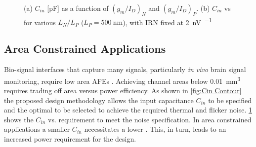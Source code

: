 \begin{figure}[!h]
\begin{subfigure}[c]{0.49\linewidth}
            \caption[]%
            {{\small }}
            \label{fig:Cin Vs. GMID}
        \end{subfigure}
        \caption[ Don't write caption here ]
        {(a) $C_{in}$ [\si{\pico\farad}] as a  function of $(g_m/I_D)_N$ and $(g_m/I_D)_P$. (b) $C_{in}$ vs \gmID for various $L_N/L_P$ ($L_P=\SI{500}{\nano\metre}$), with IRN fixed at \SI{2}{\nano\volt\per\sqrt{\hertz}} } 
        \label{fig:Cin}
\end{figure}

\subsection{Area Constrained Applications} 
Bio-signal interfaces that capture many signals, particularly \textit{in vivo} brain signal monitoring, require low area AFEs \cite{yang2023ac}. Achieving channel areas below \SI{0.01}{\milli\metre^3} requires trading off area versus power efficiency. As shown in \cref{fig:Cin Contour} the proposed design methodology allows the input capacitance $C_{in}$ to be specified and the optimal \gmID to be selected to achieve the required thermal and flicker noise. \cref{fig:Cin Vs. GMID} shows the $C_{in}$ vs. \gmID requirement to meet the noise specification. In area constrained applications a smaller $C_{in}$ necessitates a lower \gmID. This, in turn, leads to an increased power requirement for the design.
